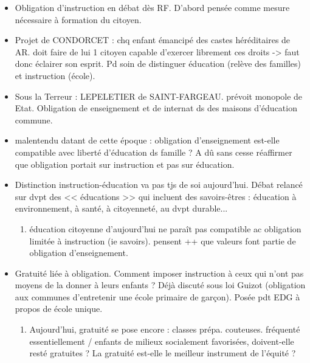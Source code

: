 \documentclass[12pt]{report}
\begin{document}
\begin{itemize}
\item Obligation d'instruction en débat dès RF. D'abord pensée comme mesure nécessaire à formation du citoyen.\\

\item Projet de CONDORCET : chq enfant émancipé  des castes héréditaires de AR. doit faire de lui 1 citoyen capable d'exercer librement ces droits -> faut donc éclairer son esprit. Pd soin de distinguer éducation (relève des familles) et instruction (école). \\

\item Sous la Terreur : LEPELETIER de SAINT-FARGEAU. prévoit monopole de Etat. Obligation de enseignement et de internat ds des maisons d'éducation commune. \\

\item malentendu datant de cette époque : obligation d'enseignement est-elle compatible avec liberté d'éducation ds famille ? A dû sans cesse réaffirmer que obligation portait sur instruction et pas sur éducation. \\

\item Distinction instruction-éducation va pas tjs de soi aujourd'hui. Débat relancé sur dvpt des << éducations >> qui incluent des savoirs-êtres : éducation à environnement, à santé, à citoyenneté, au dvpt durable... \\
\begin{enumerate}
\item éducation citoyenne d'aujourd'hui ne paraît pas compatible ac obligation limitée à instruction (ie savoirs). pensent ++ que valeurs font partie de obligation d'enseignement.\\
\end{enumerate}
 
 \item Gratuité liée à obligation. Comment imposer instruction à ceux qui n'ont pas moyens de la donner à leurs enfants ? Déjà discuté sous loi Guizot (obligation aux communes d'entretenir une école primaire de garçon). Posée pdt EDG à propos de école unique.
 \begin{enumerate}
 \item Aujourd'hui, gratuité se pose encore : classes prépa. couteuses. fréquenté essentiellement / enfants de milieux socialement favorisées, doivent-elle resté gratuites ? La gratuité est-elle le meilleur instrument de l'équité ?\\
 \end{enumerate}


\end{itemize}
\end{document}
